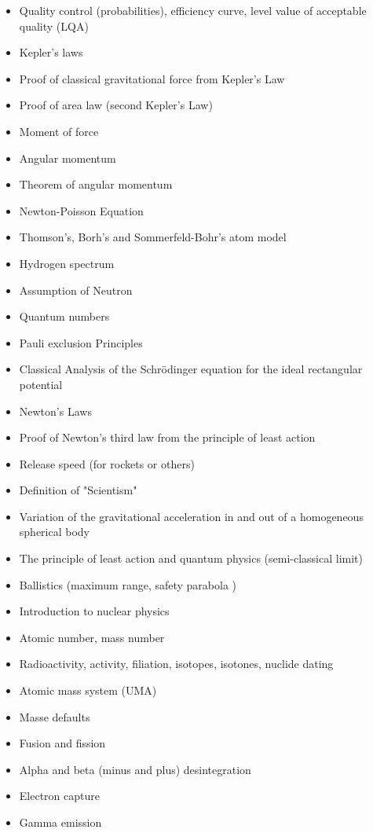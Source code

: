\documentclass[12pt,a4paper,twoside,openright]{report}
\newcounter{def}
\theoremstyle{definition}
\theoremstyle{itexmp}
\numberwithin{equation}{section}
\begin{document}
\begin{itemize}
\begin{itemize}[noitemsep]
				\item Quality control (probabilities), efficiency curve, level value of acceptable quality (LQA)
				\item Kepler's laws
				\item Proof of classical gravitational force from Kepler's Law
				\item Proof of area law (second Kepler's Law)
				\item Moment of force
				\item Angular momentum
				\item Theorem of angular momentum
				\item Newton-Poisson Equation
				\item Thomson's, Borh's and Sommerfeld-Bohr's atom model
				\item Hydrogen spectrum
				\item Assumption of Neutron
				\item Quantum numbers
				\item Pauli exclusion Principles
				\item Classical Analysis of the Schrödinger equation for the ideal rectangular potential
				\item Newton's Laws
				\item Proof of Newton's third law from the principle of least action
				\item Release speed (for rockets or others)
				\item Definition of "Scientism"
				\item Variation of the gravitational acceleration in and out of a homogeneous spherical body
				\item The principle of least action and quantum physics (semi-classical limit)
				\item Ballistics (maximum range, safety parabola )
				\item Introduction to nuclear physics
				\item Atomic number, mass number
				\item Radioactivity, activity, filiation, isotopes, isotones, nuclide dating
				\item Atomic mass system (UMA)
				\item Masse defaults
				\item Fusion and fission
				\item Alpha and beta (minus and plus) desintegration
				\item Electron capture
				\item Gamma emission

\end{itemize}
\end{itemize}
\end{document}
